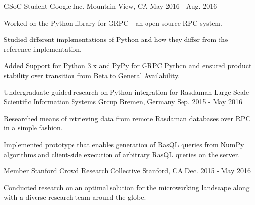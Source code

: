

\begin{cventries}
  \cventry
    {GSoC Student} %
    {Google Inc.} %
    {Mountain View, CA} %
    {May 2016 - Aug. 2016} %
    {
      \begin{cvitems} %
        \item {Worked on the Python library for GRPC - an open source RPC system.}
        \item {Studied different implementations of Python and how they differ from the reference implementation.}
        \item {Added Support for Python 3.x and PyPy for GRPC Python and ensured product stability over transition from Beta to General Availability.}
      \end{cvitems}
    }
  \cventry
    {Undergraduate guided research on Python integration for Rasdaman} %
    {Large-Scale Scientific Information Systems Group} %
    {Bremen, Germany} %
    {Sep. 2015 - May 2016} %
    {
      \begin{cvitems} %
        \item {Researched means of retrieving data from remote Rasdaman databases over RPC in a simple fashion.}
        \item {Implemented prototype that enables generation of RasQL queries from NumPy algorithms and client-side execution of arbitrary RasQL queries on the server.}
      \end{cvitems} 
    }
\cventry
  {Member} %
  {Stanford Crowd Research Collective} %
  {Stanford, CA} %
  {Dec. 2015 - May 2016} %
  {
    \begin{cvitems} %
      \item {Conducted research on an optimal solution for the microworking landscape along with a diverse research team around the globe.}

\end{cvitems}}
\end{cventries}
